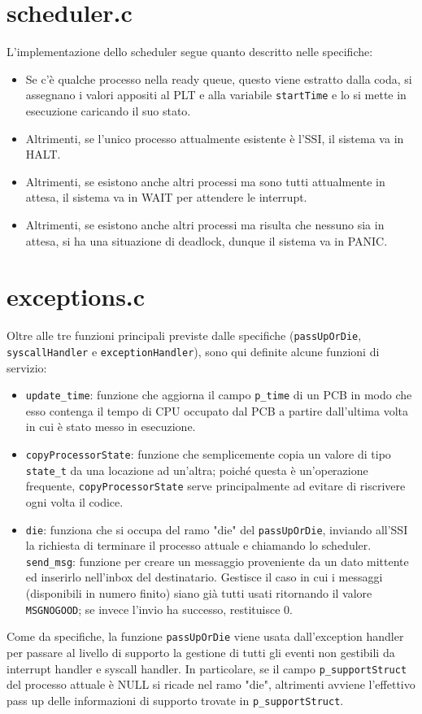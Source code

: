 \documentclass[a4paper]{article}
\begin{document}
\section{scheduler.c}
L'implementazione dello scheduler segue quanto descritto nelle specifiche:
\begin{itemize}
\item Se c'è qualche processo nella ready queue, questo viene estratto dalla coda, si assegnano i valori appositi al PLT e alla variabile \verb+startTime+ e lo
	si mette in esecuzione caricando il suo stato.
\item Altrimenti, se l'unico processo attualmente esistente è l'SSI, il sistema va in HALT.
\item Altrimenti, se esistono anche altri processi ma sono tutti attualmente in attesa, il sistema va in WAIT per attendere le interrupt.
\item Altrimenti, se esistono anche altri processi ma risulta che nessuno sia in attesa, si ha una situazione di deadlock, dunque il sistema va in PANIC.
\end{itemize}

\section{exceptions.c}
Oltre alle tre funzioni principali previste dalle specifiche (\verb+passUpOrDie+, \verb+syscallHandler+ e \verb+exceptionHandler+), sono qui definite alcune funzioni di servizio:
\begin{itemize}
	\item \verb+update_time+: funzione che aggiorna il campo \verb+p_time+ di un PCB in modo che esso contenga il tempo di CPU occupato dal PCB a partire 	dall'ultima volta in cui è stato messo in esecuzione.
	\item \verb+copyProcessorState+: funzione che semplicemente copia un valore di tipo \verb+state_t+ da una locazione ad un'altra; poiché questa è un'operazione frequente, \verb+copyProcessorState+ serve principalmente ad evitare di riscrivere ogni volta il codice.
	\item \verb+die+: funziona che si occupa del ramo "die" del \verb+passUpOrDie+, inviando all'SSI la richiesta di terminare il processo attuale e chiamando lo scheduler.
	\verb+send_msg+: funzione per creare un messaggio proveniente da un dato mittente ed inserirlo nell'inbox del destinatario. Gestisce il caso in cui i messaggi (disponibili in numero finito) siano già tutti usati ritornando il valore \verb+MSGNOGOOD+; se invece l'invio ha successo, restituisce 0.
\end{itemize}
Come da specifiche, la funzione \verb+passUpOrDie+ viene usata dall'exception handler per passare al livello di supporto la gestione di tutti gli eventi non gestibili da interrupt handler e syscall handler. In particolare, se il campo \verb+p_supportStruct+ del processo attuale è NULL si ricade nel ramo "die", altrimenti avviene l'effettivo pass up delle informazioni di supporto trovate in \verb+p_supportStruct+.
\end{document}
